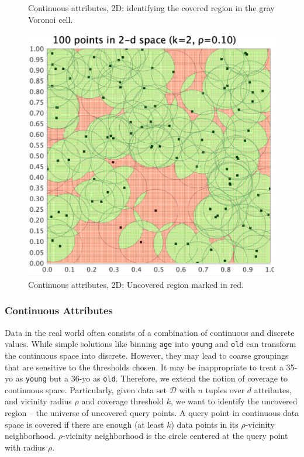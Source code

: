 \documentclass[11pt]{article}
\newcommand{\dee}{\mathcal{D}}
\begin{document}
\begin{figure}[!tb]
\begin{minipage}[t]{0.31\linewidth}
        \caption{\small Continuous attributes, 2D: identifying the covered region in the gray Voronoi cell.}
        \label{fig:cvrg_2_1}
    \end{minipage}
    \hfill
    \begin{minipage}[t]{0.31\linewidth}
        \centering
        \includegraphics[width=\textwidth]{submissions/submission1/shahbazi/cvrg_2_2.jpg}
        \caption{ \small Continuous attributes, 2D: Uncovered region marked in red.}
        \label{fig:cvrg_2_2}
    \end{minipage}
\vspace{-5mm}
\end{figure}

\subsubsection{Continuous Attributes}
Data in the real world often consists of a combination of continuous and discrete values. While simple solutions like binning {\tt age} into {\tt young} and {\tt old} can transform the continuous space into discrete. However, they may lead to coarse groupings that are sensitive to the thresholds chosen. It may be inappropriate to treat a 35-yo as {\tt young} but a 36-yo as {\tt old}. 
Therefore, we extend the notion of coverage to continuous space. Particularly, given data set $\dee$ with $n$ tuples over $d$ attributes, and vicinity radius $\rho$ and coverage threshold $k$, we want to identify the uncovered region -- the universe of uncovered query points.
A query point in continuous data space is covered if there are enough (at least $k$) data points in its $\rho$-vicinity neighborhood. $\rho$-vicinity neighborhood is the circle centered at the query point with radius $\rho$.
\end{document}
